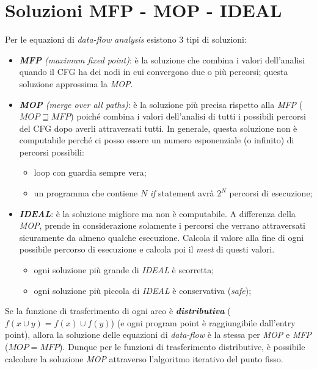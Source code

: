 \documentclass[a4paper, 11pt]{report}
\begin{document}
\section*{Soluzioni MFP - MOP - IDEAL}
Per le equazioni di \textit{data-flow analysis} esistono 3 tipi di soluzioni:
\begin{itemize}
	\item \textit{\textbf{MFP} (maximum fixed point)}: è la soluzione che combina i valori dell'analisi quando il CFG ha dei nodi in cui convergono due o più percorsi; questa soluzione approssima la \textit{MOP}.
	\item \textit{\textbf{MOP} (merge over all paths)}: è la soluzione più precisa rispetto alla \textit{MFP} ($MOP \sqsupseteq MFP$) poiché combina i valori dell'analisi di tutti i possibili percorsi del CFG dopo averli attraversati tutti. In generale, questa soluzione non è computabile perché ci posso essere un numero esponenziale (o infinito) di percorsi possibili:
	\begin{itemize}
		\item loop con guardia sempre vera;
		\item un programma che contiene $N$ \textit{if} statement avrà $2^N$ percorsi di esecuzione;
	\end{itemize}
	\item \textbf{\textit{IDEAL}}: è la soluzione migliore ma non è computabile. A differenza della \textit{MOP}, prende in considerazione solamente i percorsi che verrano attraversati sicuramente da almeno qualche esecuzione. Calcola il valore alla fine di ogni possibile percorso di esecuzione e calcola poi il \textit{meet} di questi valori.
	\begin{itemize}
		\item ogni soluzione più grande di \textit{IDEAL} è scorretta;
		\item ogni soluzione più piccola di \textit{IDEAL} è conservativa (\textit{safe});
	\end{itemize}
\end{itemize}
Se la funzione di trasferimento di ogni arco è \textbf{\textit{distributiva}} ($f(x \cup y) = f(x) \cup f(y)$) (e ogni program point è raggiungibile dall'entry point), allora la soluzione delle equazioni di \textit{data-flow} è la stessa per \textit{MOP} e \textit{MFP} ($MOP = MFP$). Dunque per le funzioni di trasferimento distributive, è possibile calcolare la soluzione \textit{MOP} attraverso l'algoritmo iterativo del punto fisso.
\newline
\end{document}

